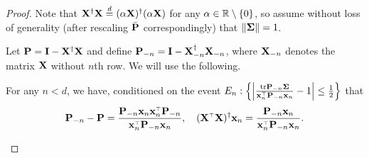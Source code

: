 \documentclass[11pt]{article}
\begin{document}
\begin{proof}
  Note that $\X^\dag \X \overset{d}{=} (\alpha \X)^\dag (\alpha \X)$
  for any $\alpha \in \R \setminus \{0\}$, so
  assume without loss of generality (after rescaling $\bar{\P}$ correspondingly)
  that $\|\Sigmab\| = 1$.

  Let $\P=\I-\X^\dagger\X$ and define $\P_{-n}=\I-\X_{-n}^\dagger\X_{-n}$,
  where $\X_{-n}$ denotes the matrix $\X$ without $n$th row. We will use the
  following.

\begin{lemma}\label{l:rank-one-update}
    For any $n<d$, we have, conditioned on the event $E_n: \left\{ \left| \frac{\tr \P_{-n} \Sigmab}{\x_n^\top \P_{-n} \x_n} - 1 \right| \le \frac12 \right\}$ that
    \begin{align*}
       \P_{-n} - \P = \frac{\P_{-n} \x_n \x_n^\top \P_{-n}}{\x_n^\top \P_{-n} \x_n}, \quad (\X^\top\X)^\dagger\x_n =
      \frac{\P_{-n}\x_n}{\x_n^\top\P_{-n}\x_n}.
    \end{align*}
\end{lemma}



\end{proof}
\end{document}

